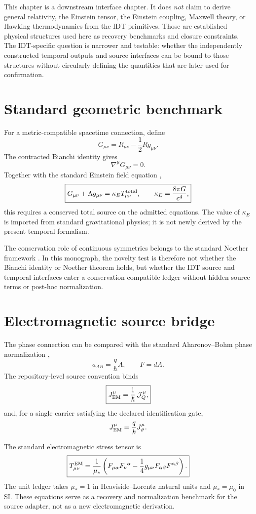 This chapter is a downstream interface chapter. It does \emph{not} claim to derive general relativity, the Einstein tensor, the Einstein coupling, Maxwell theory, or Hawking thermodynamics from the IDT primitives. Those are established physical structures used here as recovery benchmarks and closure constraints. The IDT-specific question is narrower and testable: whether the independently constructed temporal outputs and source interfaces can be bound to those structures without circularly defining the quantities that are later used for confirmation.

\section{Standard geometric benchmark}

For a metric-compatible spacetime connection, define
\[
G_{\mu\nu}=R_{\mu\nu}-\frac12Rg_{\mu\nu}.
\]
The contracted Bianchi identity gives
\[
\boxed{\nabla^\mu G_{\mu\nu}=0.}
\]
Together with the standard Einstein field equation \cite{Einstein1916},
\[
\boxed{
G_{\mu\nu}+\Lambda g_{\mu\nu}
=
\kappa_E T^{\rm total}_{\mu\nu},
\qquad
\kappa_E=\frac{8\pi G}{c^4},
}
\]
this requires a conserved total source on the admitted equations. The value of \(\kappa_E\) is imported from standard gravitational physics; it is not newly derived by the present temporal formalism.

The conservation role of continuous symmetries belongs to the standard Noether framework \cite{Noether1971}. In this monograph, the novelty test is therefore not whether the Bianchi identity or Noether theorem holds, but whether the IDT source and temporal interfaces enter a conservation-compatible ledger without hidden source terms or post-hoc normalization.

\section{Electromagnetic source bridge}

The phase connection can be compared with the standard Aharonov--Bohm phase normalization \cite{AharonovBohm1959},
\[
a_{AB}=\frac{q}{\hbar}A,
\qquad
F=dA.
\]
The repository-level source convention binds
\[
\boxed{
J_{\rm EM}^{\mu}=\frac{1}{\hbar}\,\mathcal J_Q^{\mu},
}
\]
and, for a single carrier satisfying the declared identification gate,
\[
J_{\rm EM}^{\mu}=\frac{q}{\hbar}J_{\vartheta}^{\mu}.
\]

The standard electromagnetic stress tensor is
\[
\boxed{
T^{\rm EM}_{\mu\nu}
=
\frac{1}{\mu_*}
\left(
F_{\mu\alpha}F_{\nu}{}^{\alpha}
-\frac14g_{\mu\nu}F_{\alpha\beta}F^{\alpha\beta}
\right).
}
\]
The unit ledger takes \(\mu_*=1\) in Heaviside--Lorentz natural units and \(\mu_*=\mu_0\) in SI. These equations serve as a recovery and normalization benchmark for the source adapter, not as a new electromagnetic derivation.

